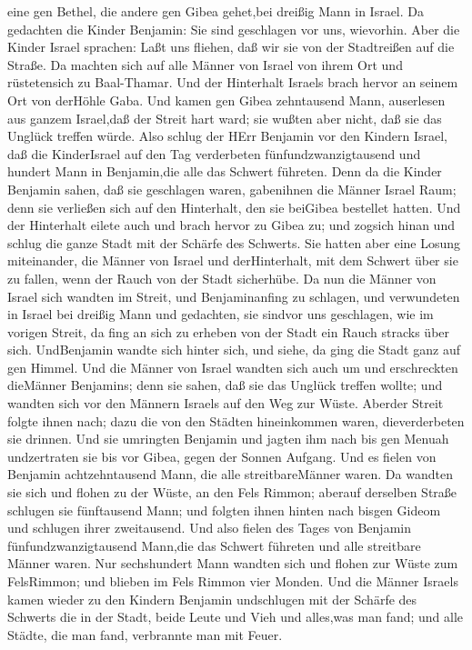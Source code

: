 eine gen Bethel, die andere gen Gibea gehet,bei dreißig Mann in Israel.
 Da gedachten die Kinder Benjamin: Sie sind geschlagen vor
uns, wievorhin. Aber die Kinder Israel sprachen: Laßt uns fliehen, daß
wir sie von der Stadtreißen auf die Straße.  Da machten
sich auf alle Männer von Israel von ihrem Ort und rüstetensich zu
Baal-Thamar. Und der Hinterhalt Israels brach hervor an seinem Ort von
derHöhle Gaba.  Und kamen gen Gibea zehntausend Mann,
auserlesen aus ganzem Israel,daß der Streit hart ward; sie wußten aber
nicht, daß sie das Unglück treffen würde.  Also schlug der
HErr Benjamin vor den Kindern Israel, daß die KinderIsrael auf den Tag
verderbeten fünfundzwanzigtausend und hundert Mann in Benjamin,die alle
das Schwert führeten.  Denn da die Kinder Benjamin sahen,
daß sie geschlagen waren, gabenihnen die Männer Israel Raum; denn sie
verließen sich auf den Hinterhalt, den sie beiGibea bestellet hatten.
 Und der Hinterhalt eilete auch und brach hervor zu Gibea
zu; und zogsich hinan und schlug die ganze Stadt mit der Schärfe des
Schwerts.  Sie hatten aber eine Losung miteinander, die
Männer von Israel und derHinterhalt, mit dem Schwert über sie zu fallen,
wenn der Rauch von der Stadt sicherhübe.  Da nun die Männer
von Israel sich wandten im Streit, und Benjaminanfing zu schlagen, und
verwundeten in Israel bei dreißig Mann und gedachten, sie sindvor uns
geschlagen, wie im vorigen Streit,  da fing an sich zu
erheben von der Stadt ein Rauch stracks über sich. UndBenjamin wandte
sich hinter sich, und siehe, da ging die Stadt ganz auf gen Himmel.
 Und die Männer von Israel wandten sich auch um und
erschreckten dieMänner Benjamins; denn sie sahen, daß sie das Unglück
treffen wollte;  und wandten sich vor den Männern Israels
auf den Weg zur Wüste. Aberder Streit folgte ihnen nach; dazu die von
den Städten hineinkommen waren, dieverderbeten sie drinnen.
 Und sie umringten Benjamin und jagten ihm nach bis gen
Menuah undzertraten sie bis vor Gibea, gegen der Sonnen Aufgang.
 Und es fielen von Benjamin achtzehntausend Mann, die alle
streitbareMänner waren.  Da wandten sie sich und flohen zu
der Wüste, an den Fels Rimmon; aberauf derselben Straße schlugen sie
fünftausend Mann; und folgten ihnen hinten nach bisgen Gideom und
schlugen ihrer zweitausend.  Und also fielen des Tages von
Benjamin fünfundzwanzigtausend Mann,die das Schwert führeten und alle
streitbare Männer waren.  Nur sechshundert Mann wandten
sich und flohen zur Wüste zum FelsRimmon; und blieben im Fels Rimmon
vier Monden.  Und die Männer Israels kamen wieder zu den
Kindern Benjamin undschlugen mit der Schärfe des Schwerts die in der
Stadt, beide Leute und Vieh und alles,was man fand; und alle Städte, die
man fand, verbrannte man mit Feuer.

